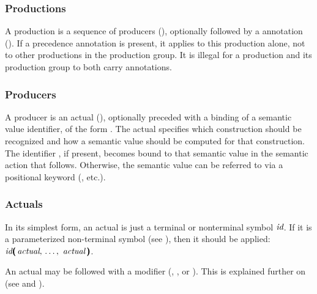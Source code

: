 \documentclass[onecolumn,11pt,nocopyrightspace,preprint]{sigplanconf}
\begin{document}
\subsubsection{Productions}
\label{sec:productions}

A production is a sequence of producers (), optionally
followed by a \dprec annotation (). If a precedence annotation
is present, it applies to this production alone, not to other productions in
the production group. It is illegal for a production and its production group
to both carry \dprec annotations.

\subsubsection{Producers}
\label{sec:producers}

A producer is an actual (), optionally preceded with a
binding of a semantic value identifier, of the form  \dequal. The
actual specifies which construction should be recognized and how a semantic
value should be computed for that construction. The identifier , if
present, becomes bound to that semantic value in the semantic action that
follows. Otherwise, the semantic value can be referred to via a positional
keyword (, etc.).

\subsubsection{Actuals}
\label{sec:actual}

In its simplest form, an actual is just a terminal or nonterminal symbol
$\textit{id}$. If it is a parameterized non-terminal symbol (see
), then it should be applied:
$\nt{id}\tuple{\nt{actual}}$.

An actual may be followed with a modifier (\dquestion, \dplus, or
\dstar). This is explained further on (see  and
).
\end{document}
